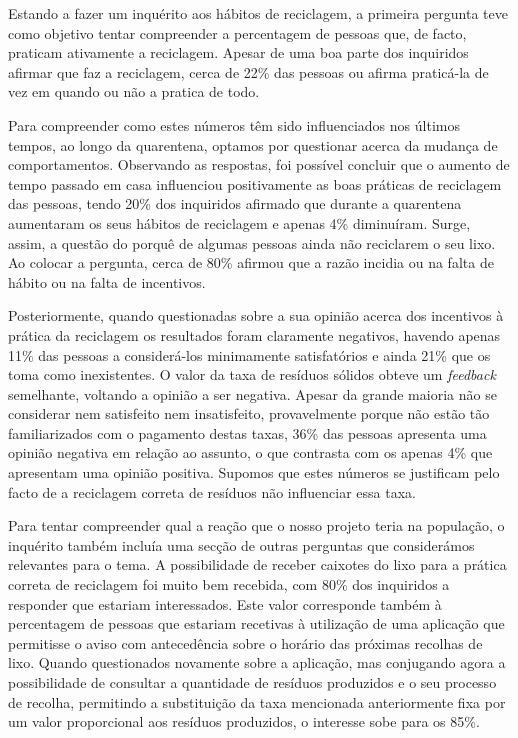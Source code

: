 \documentclass[11pt, a4paper, oneside]{book}
\begin{document}
Estando a fazer um inquérito aos hábitos de reciclagem, a primeira pergunta teve como objetivo tentar compreender a percentagem de pessoas que, de facto, praticam ativamente a reciclagem. Apesar de uma boa parte dos inquiridos afirmar que faz a reciclagem, cerca de 22\% das pessoas ou afirma praticá-la de vez em quando ou não a pratica de todo.

Para compreender como estes números têm sido influenciados nos últimos tempos, ao longo da quarentena, optamos por questionar acerca da mudança de comportamentos. Observando as respostas, foi possível concluir que o aumento de tempo passado em casa influenciou positivamente as boas práticas de reciclagem das pessoas, tendo 20\% dos inquiridos afirmado que durante a quarentena aumentaram os seus hábitos de reciclagem e apenas 4\% diminuíram.
Surge, assim, a questão do porquê de algumas pessoas ainda não reciclarem o seu lixo. Ao colocar a pergunta, cerca de 80\% afirmou que a razão incidia ou na falta de hábito ou na falta de incentivos.

Posteriormente, quando questionadas sobre a sua opinião acerca dos incentivos à prática da reciclagem os resultados foram claramente negativos, havendo apenas 11\% das pessoas a considerá-los minimamente satisfatórios e ainda 21\% que os toma como inexistentes. O valor da taxa de resíduos sólidos obteve um \textit{feedback} semelhante, voltando a opinião a ser negativa. Apesar da grande maioria não se considerar nem satisfeito nem insatisfeito, provavelmente porque não estão tão familiarizados com o pagamento destas taxas, 36\% das pessoas apresenta uma opinião negativa em relação ao assunto, o que contrasta com os apenas 4\% que apresentam uma opinião positiva. Supomos que estes números se justificam pelo facto de a reciclagem correta de resíduos não influenciar essa taxa.

Para tentar compreender qual a reação que o nosso projeto teria na população, o inquérito também incluía uma secção de outras perguntas que considerámos relevantes para o tema. A possibilidade de receber caixotes do lixo para a prática correta de reciclagem foi muito bem recebida, com 80\% dos inquiridos a responder que estariam interessados. Este valor corresponde também à percentagem de pessoas que estariam recetivas à utilização de uma aplicação que permitisse o aviso com antecedência sobre o horário das próximas recolhas de lixo.
Quando questionados novamente sobre a aplicação, mas conjugando agora a possibilidade de consultar a quantidade de resíduos produzidos e o seu processo de recolha, permitindo a substituição da taxa mencionada anteriormente fixa por um valor proporcional aos resíduos produzidos, o interesse sobe para os 85\%.
\end{document}
